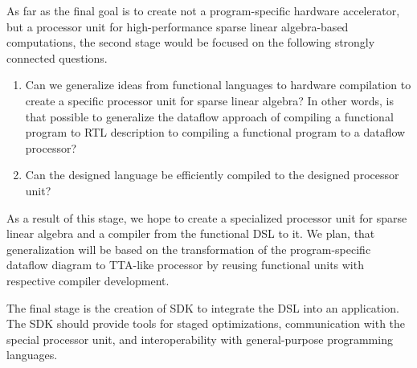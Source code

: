 \documentclass[10pt,conference]{IEEEtran}
\begin{document}
As far as the final goal is to create not a program-specific hardware accelerator, but a processor unit for high-performance sparse linear algebra-based computations, the second stage would be focused on the following strongly connected questions. 
\begin{enumerate}  
  \item Can we generalize ideas from functional languages to hardware compilation to create a specific processor unit for sparse linear algebra? In other words, is that possible to generalize the dataflow approach of compiling a functional program to RTL description to compiling a functional program to a dataflow processor?
  \item Can the designed language be efficiently compiled to the designed processor unit?
\end{enumerate}

As a result of this stage, we hope to create a specialized processor unit for sparse linear algebra and a compiler from the functional DSL to it.
We plan, that generalization will be based on the transformation of the program-specific dataflow diagram to TTA-like processor by reusing functional units with respective compiler development.


The final stage is the creation of SDK to integrate the DSL into an application. 
The SDK should provide tools for staged optimizations, communication with the special processor unit, and interoperability with general-purpose programming languages. 







\end{document}
